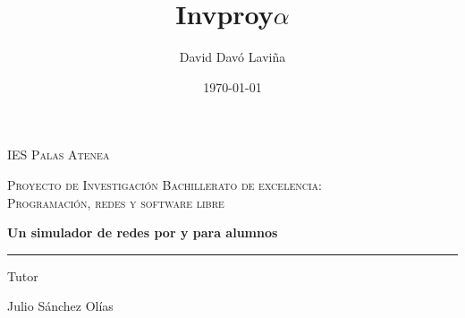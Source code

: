 \documentclass[a4paper, 11pt]{report} %
\title{Invproy\space $\alpha$}
\author{David Davó Laviña}
\date{\today{}}
\begin{document}

\makeatletter
\begin{titlepage}
\centering
\vspace*{1cm}
{\scshape\huge IES Palas Atenea \par}
\vspace{2cm}
{\scshape\LARGE Proyecto de Investigación Bachillerato de excelencia:\\
Programación, redes y software libre\par}
\vspace{1.5cm}
{\fontsize{42pt}{42pt}\bfseries\color{DarkRed} \@title\par}
{\fontsize{24pt}{24pt}\bfseries Un simulador de redes por y para alumnos \par}
{\color{DarkRed}\rule{0.5\textwidth}{1pt}\par}
\vspace{2cm}
{\LARGE\itshape \@author\par}
\vfill
{\Large Tutor\par
Julio Sánchez Olías}

\vfill

{\Large \@date\par}
\restoregeometry
\end{titlepage}
\clearpage




\renewcommand\cftchapfont{\bf\color{chaptercolour}}
\renewcommand\cftchappagefont{\bf\color{chaptercolour}}
\end{document}
